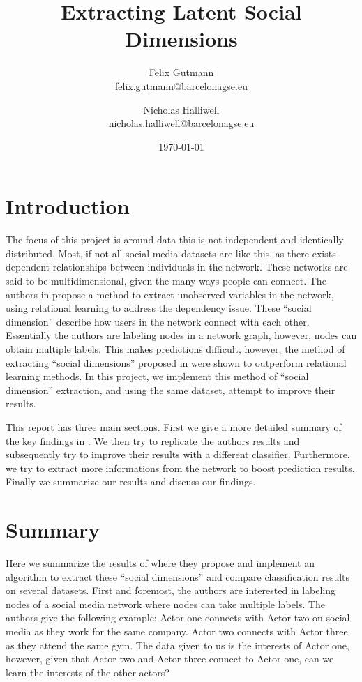 \documentclass[11pt,letterpaper]{article}
\author{
	Felix Gutmann\\
	\href{mailto:felix.gutmann@barcelonagse.eu}{felix.gutmann@barcelonagse.eu}
	\and
	Nicholas Halliwell\\
	\href{mailto:nicholas.halliwell@barcelonagse.eu}{nicholas.halliwell@barcelonagse.eu}}
\title{Extracting Latent Social Dimensions}
\date{\today}
\begin{document}
\maketitle

\section*{Introduction} 

The focus of this project is around data this is not independent and identically distributed. Most, if not all social media datasets are like this, as there exists dependent relationships between individuals in the network. These networks are said to be multidimensional, given the many ways people can connect. The authors in \cite{latent} propose a method to extract unobserved variables in the network, using relational learning to address the dependency issue. These ``social dimension'' describe how users in the network connect with each other. Essentially the authors are labeling nodes in a network graph, however, nodes can obtain multiple labels. This makes predictions difficult, however, the method of extracting ``social dimensions'' proposed in \cite{latent} were shown to outperform relational learning methods. In this project, we implement this method of ``social dimension'' extraction, and using the same dataset, attempt to improve their results.

This report has three main sections. First we give a more detailed summary of the key findings in \cite{latent}. We then try to replicate the authors results and subsequently try to improve their results with a different classifier. Furthermore, we try to extract more informations from the network to boost prediction results.
Finally we summarize our results and discuss our findings.

\section*{Summary}
Here we summarize the results of \cite{latent} where they propose and implement an algorithm to extract these ``social dimensions'' and compare classification results on several datasets. First and foremost, the authors are interested in labeling nodes of a social media network where nodes can take multiple labels. The authors give the following example; Actor one connects with Actor two on social media as they work for the same company. Actor two connects with Actor three as they attend the same gym. The data given to us is the interests of Actor one, however, given that Actor two and Actor three connect to Actor one, can we learn the interests of the other actors?\par
\end{document}
